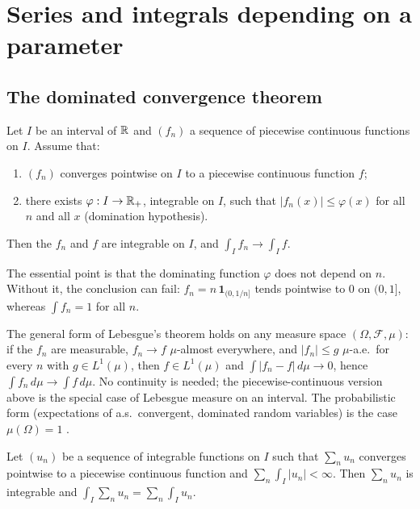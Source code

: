 \section{Series and integrals depending on a parameter}\label{appA:sec:param}

\subsection{The dominated convergence theorem}

\begin{theorem}\label{appA:thm:cvd}
Let $I$ be an interval of $\mathbb{R}$ and $(f_n)$ a sequence of piecewise continuous functions on $I$. Assume that:
\begin{enumerate}
\item $(f_n)$ converges pointwise on $I$ to a piecewise continuous function $f$;
\item there exists $\varphi:I\to\mathbb{R}_+$, integrable on $I$, such that $|f_n(x)|\le\varphi(x)$ for all $n$ and all $x$
(domination hypothesis).
\end{enumerate}
Then the $f_n$ and $f$ are integrable on $I$, and $\int_If_n\to\int_If$.
\end{theorem}

The essential point is that the dominating function $\varphi$ does not depend on $n$. Without it, the conclusion can
fail: $f_n=n\,\mathbf 1_{(0,1/n]}$ tends pointwise to $0$ on $(0,1]$, whereas $\int f_n=1$ for all $n$.

\begin{uniremark}\tierL{} The general form of Lebesgue's theorem holds on any measure space $(\Omega,\mathcal F,\mu)$:
if the $f_n$ are measurable, $f_n\to f$ $\mu$-almost everywhere, and $|f_n|\le g$ $\mu$-a.e.\ for every $n$ with
$g\in L^1(\mu)$, then $f\in L^1(\mu)$ and $\int|f_n-f|\,d\mu\to0$, hence $\int f_n\,d\mu\to\int f\,d\mu$. No continuity
is needed; the piecewise-continuous version above is the special case of Lebesgue measure on an interval. The
probabilistic form (expectations of a.s.\ convergent, dominated random variables) is the case $\mu(\Omega)=1$
\cite{app:williams}.
\end{uniremark}

\begin{theorem}\label{appA:thm:serieint}
Let $(u_n)$ be a sequence of integrable functions on $I$ such that $\sum_n u_n$ converges pointwise to a piecewise
continuous function and $\sum_n\int_I|u_n|<\infty$. Then $\sum_nu_n$ is integrable and
$\int_I\sum_nu_n=\sum_n\int_Iu_n$.
\end{theorem}

